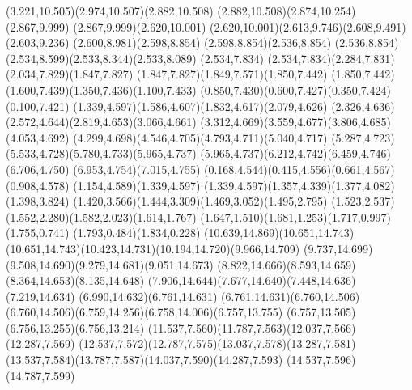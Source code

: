 \documentclass[10pt]{article}
\begin{document}
{{(3.221,10.505)(2.974,10.507)(2.882,10.508)\relax
{}(2.882,10.508)(2.874,10.254)(2.867,9.999)\relax
{}(2.867,9.999)(2.620,10.001)\relax
{}(2.620,10.001)(2.613,9.746)(2.608,9.491)(2.603,9.236)%
(2.600,8.981)(2.598,8.854)\relax
{}(2.598,8.854)(2.536,8.854)\relax
{}(2.536,8.854)(2.534,8.599)(2.533,8.344)(2.533,8.089)%
(2.534,7.834)\relax
{}(2.534,7.834)(2.284,7.831)(2.034,7.829)(1.847,7.827)%
\relax
{}(1.847,7.827)(1.849,7.571)(1.850,7.442)\relax
{}(1.850,7.442)(1.600,7.439)(1.350,7.436)(1.100,7.433)%
(0.850,7.430)(0.600,7.427)(0.350,7.424)(0.100,7.421)%
\relax
{}(1.339,4.597)(1.586,4.607)(1.832,4.617)(2.079,4.626)%
(2.326,4.636)(2.572,4.644)(2.819,4.653)(3.066,4.661)%
(3.312,4.669)(3.559,4.677)(3.806,4.685)(4.053,4.692)%
(4.299,4.698)(4.546,4.705)(4.793,4.711)(5.040,4.717)%
(5.287,4.723)(5.533,4.728)(5.780,4.733)(5.965,4.737)%
\relax
{}(5.965,4.737)(6.212,4.742)(6.459,4.746)(6.706,4.750)%
(6.953,4.754)(7.015,4.755)\relax
{}(0.168,4.544)(0.415,4.556)(0.661,4.567)(0.908,4.578)%
(1.154,4.589)(1.339,4.597)\relax
{}(1.339,4.597)(1.357,4.339)(1.377,4.082)(1.398,3.824)%
(1.420,3.566)(1.444,3.309)(1.469,3.052)(1.495,2.795)%
(1.523,2.537)(1.552,2.280)(1.582,2.023)(1.614,1.767)%
(1.647,1.510)(1.681,1.253)(1.717,0.997)(1.755,0.741)%
(1.793,0.484)(1.834,0.228)\relax
{}(10.639,14.869)(10.651,14.743)\relax
{}(10.651,14.743)(10.423,14.731)(10.194,14.720)(9.966,14.709)%
(9.737,14.699)(9.508,14.690)(9.279,14.681)(9.051,14.673)%
(8.822,14.666)(8.593,14.659)(8.364,14.653)(8.135,14.648)%
(7.906,14.644)(7.677,14.640)(7.448,14.636)(7.219,14.634)%
(6.990,14.632)(6.761,14.631)\relax
{}(6.761,14.631)(6.760,14.506)\relax
{}(6.760,14.506)(6.759,14.256)(6.758,14.006)(6.757,13.755)%
(6.757,13.505)(6.756,13.255)(6.756,13.214)\relax
{}(11.537,7.560)(11.787,7.563)(12.037,7.566)(12.287,7.569)%
(12.537,7.572)(12.787,7.575)(13.037,7.578)(13.287,7.581)%
(13.537,7.584)(13.787,7.587)(14.037,7.590)(14.287,7.593)%
(14.537,7.596)(14.787,7.599)\relax
{}%
}}
\end{document}
